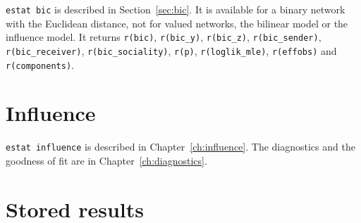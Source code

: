 \texttt{estat bic} is described in Section~\ref{sec:bic}. It is available for a binary network with the Euclidean distance, not for valued networks, the bilinear model or the influence model. It returns \texttt{r(bic)}, \texttt{r(bic\_y)}, \texttt{r(bic\_z)}, \texttt{r(bic\_sender)}, \texttt{r(bic\_receiver)}, \texttt{r(bic\_sociality)}, \texttt{r(p)}, \texttt{r(loglik\_mle)}, \texttt{r(effobs)} and \texttt{r(components)}.

\section{Influence}

\texttt{estat influence} is described in Chapter~\ref{ch:influence}. The diagnostics and the goodness of fit are in Chapter~\ref{ch:diagnostics}.

\section{Stored results}\label{sec:results}

